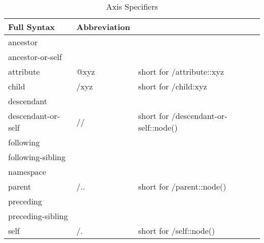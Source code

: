 \documentclass[12pt,a4paper,openright,twoside]{report}
\theoremstyle{definition}
\begin{document}
\begin{table}
  \caption{Axis Specifiers}
  \label{axistab}
    \begin{tabular}{|l|l|l|}
      \hline
        Full Syntax        & Abbreviation & ~                                     \\ \hline
        ancestor           & ~            & ~                                     \\ 
        ancestor-or-self   & ~            & ~                                     \\ 
        attribute          & @xyz         & short for /attribute::xyz             \\ 
        child              & /xyz         & short for /child:xyz                  \\ 
        descendant         & ~            & ~                                     \\ 
        descendant-or-self & //           & short for /descendant-or-self::node() \\ 
        following          & ~            & ~                                     \\ 
        following-sibling  & ~            & ~                                     \\ 
        namespace          & ~            & ~                                     \\ 
        parent             & /..          & short for /parent::node()             \\ 
        preceding          & ~            & ~                                     \\ 
        preceding-sibling  & ~            & ~                                     \\ 
        self               & /.           & short for /self::node()               \\
      \hline
    \end{tabular}
\end{table}
\end{document}
